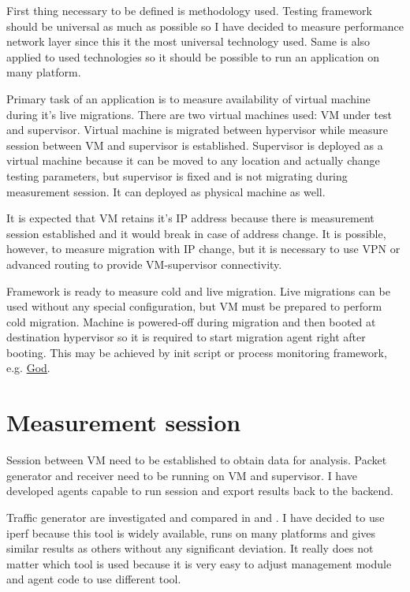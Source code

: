 
First thing necessary to be defined is methodology used. Testing framework should be universal as much as possible so I have decided to measure performance network layer since this it the most universal technology used. Same is also applied to used technologies so it should be possible to run an application on many platform. 

Primary task of an application is to measure availability of virtual machine during it's live migrations. There are two virtual machines used: \Ac{VM} under test and supervisor. Virtual machine is migrated between hypervisor while measure session between \Ac{VM} and supervisor is established. Supervisor is deployed as a virtual machine because it can be moved to any location and actually change testing parameters, but supervisor is fixed and is not migrating during measurement session. It can deployed as physical machine as well.

It is expected that \Ac{VM} retains it's \Ac{IP} address because there is measurement session established and it would break in case of address change. It is possible, however, to measure migration with \Ac{IP} change, but it is necessary to use \Ac{VPN} or advanced routing to provide \Ac{VM}-supervisor connectivity.

Framework is ready to measure cold and live migration. Live migrations can be used without any special configuration, but \Ac{VM} must be prepared to perform cold migration. Machine is powered-off during migration and then booted at destination hypervisor so it is required to start migration agent right after booting. This may be achieved by init script or process monitoring framework, e.g. \href{http://godrb.com/}{God}.

\section{Measurement session}
Session between \Ac{VM} need to be established to obtain data for analysis. Packet generator and receiver need to be running on \Ac{VM} and supervisor. I have developed agents capable to run session and export results back to the backend.

Traffic generator are investigated and compared in \cite{traffic-generators1} and \cite{traffic-generators2}. I have decided to use iperf because this tool is widely available, runs on many platforms and gives similar results as others without any significant deviation. It really does not matter which tool is used because it is very easy to adjust management module and agent code to use different tool.

